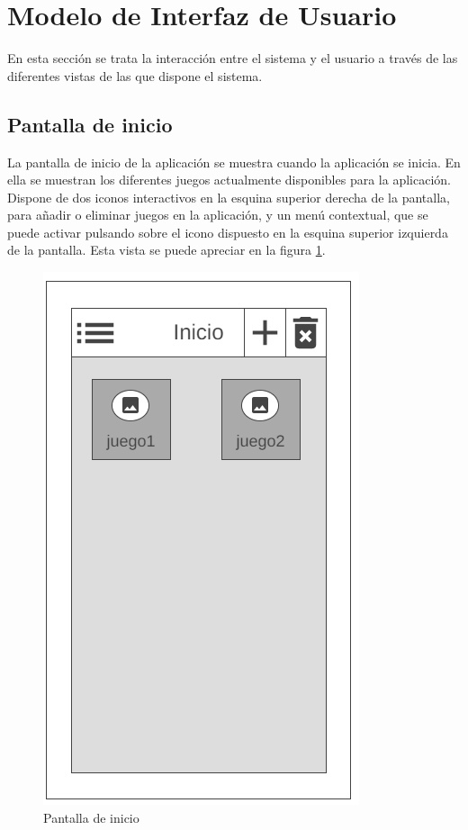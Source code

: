 
\section{Modelo de Interfaz de Usuario}
En esta sección se trata la interacción entre el sistema y el usuario a través de las diferentes vistas 
de las que dispone el sistema.

\subsection{Pantalla de inicio}
La pantalla de inicio de la aplicación se muestra cuando la aplicación se inicia. En ella se 
muestran los diferentes juegos actualmente disponibles para la aplicación.
Dispone de dos iconos interactivos en la esquina superior derecha de la pantalla, para añadir o eliminar 
juegos en la aplicación, y un menú contextual, que se puede activar pulsando sobre el icono dispuesto 
en la esquina superior izquierda de la pantalla. Esta vista se puede apreciar en la figura \ref*{PantallaInicio}.
\newpage

\begin{figure}[H]
    \centering
    \includegraphics[scale=0.3]{Figures/Mockups/Mock_Inicio.png}
    \caption{Pantalla de inicio}
    \label{PantallaInicio}    
\end{figure}

